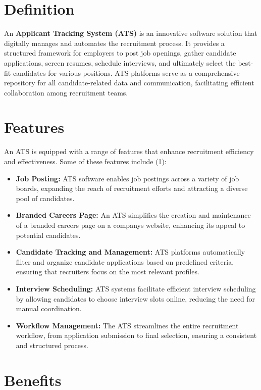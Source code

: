 \documentclass[
]{book}
\begin{document}
\hypertarget{definition}{%
\section{Definition}\label{definition}}

An \textbf{Applicant Tracking System (ATS)} is an innovative software solution that digitally manages and automates the recruitment process. It provides a structured framework for employers to post job openings, gather candidate applications, screen resumes, schedule interviews, and ultimately select the best-fit candidates for various positions. ATS platforms serve as a comprehensive repository for all candidate-related data and communication, facilitating efficient collaboration among recruitment teams.

\hypertarget{features}{%
\section{Features}\label{features}}

An ATS is equipped with a range of features that enhance recruitment efficiency and effectiveness. Some of these features include (1):

\begin{itemize}
\item
  \textbf{Job Posting:} ATS software enables job postings across a variety of job boards, expanding the reach of recruitment efforts and attracting a diverse pool of candidates.
\item
  \textbf{Branded Careers Page:} An ATS simplifies the creation and maintenance of a branded careers page on a company\textquotesingle s website, enhancing its appeal to potential candidates.
\item
  \textbf{Candidate Tracking and Management:} ATS platforms automatically filter and organize candidate applications based on predefined criteria, ensuring that recruiters focus on the most relevant profiles.
\item
  \textbf{Interview Scheduling:} ATS systems facilitate efficient interview scheduling by allowing candidates to choose interview slots online, reducing the need for manual coordination.
\item
  \textbf{Workflow Management:} The ATS streamlines the entire recruitment workflow, from application submission to final selection, ensuring a consistent and structured process.
\end{itemize}

\hypertarget{benefits}{%
\section{Benefits}\label{benefits}}
\end{document}
